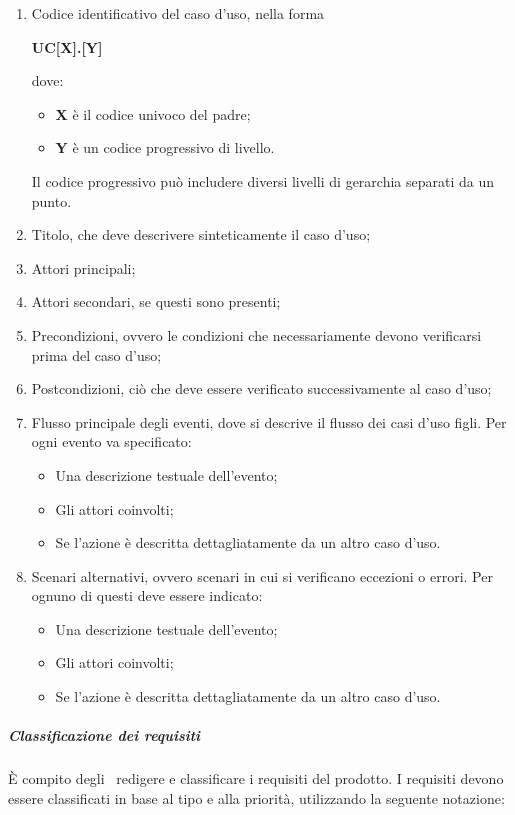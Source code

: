 \documentclass[../NormeProgetto.tex]{subfiles}
\begin{document}
				\begin{enumerate}
					\item Codice identificativo del caso d'uso, nella forma \begin{center}\textbf{UC[X].[Y]}\end{center} dove:
					\begin{itemize}
						\item \textbf{X} è il codice univoco del padre;
						\item \textbf{Y} è un codice progressivo di livello.
					\end{itemize}
					Il codice progressivo può includere diversi livelli di gerarchia separati da un punto.
					\item Titolo, che deve descrivere sinteticamente il caso d'uso;
					\item Attori principali;
					\item Attori secondari, se questi sono presenti;
					\item Precondizioni, ovvero le condizioni che necessariamente devono verificarsi prima del caso d'uso;
					\item Postcondizioni, ciò che deve essere verificato successivamente al caso d'uso;
					\item Flusso principale degli eventi, dove si descrive il flusso dei casi d'uso figli. Per ogni evento va specificato:
					\begin{itemize}
						\item Una descrizione testuale dell'evento;
						\item Gli attori coinvolti;
						\item Se l'azione è descritta dettagliatamente da un altro caso d'uso.
					\end{itemize}
					\item Scenari alternativi, ovvero scenari in cui si verificano eccezioni o errori. Per ognuno di questi deve essere indicato:
						\begin{itemize}
							\item Una descrizione testuale dell'evento;
							\item Gli attori coinvolti;
							\item Se l'azione è descritta dettagliatamente da un altro caso d'uso.
						\end{itemize}
				\end{enumerate}
				\subparagraph{Classificazione dei requisiti}
				È compito degli \analisti\ redigere e classificare i requisiti del prodotto\g.  I requisiti devono essere classificati in base al tipo e alla priorità, utilizzando la seguente notazione:
\end{document}
